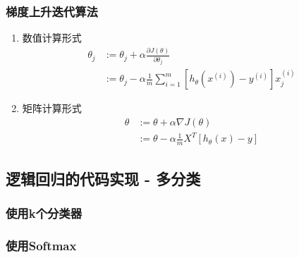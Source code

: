 \subsubsection{梯度上升迭代算法}
\begin{enumerate}
\item 数值计算形式
\begin{equation}\begin{aligned}
	\theta_j &:= \theta_j + \alpha\frac{\partial J(\theta)}{\partial \theta_j} \\
	    &:= \theta_j - \alpha \frac{1}{m} \sum_{i=1}^m \left[h_\theta(x^{(i)}) - y^{(i)}\right] x_j^{(i)}
\end{aligned}\end{equation}

\item 矩阵计算形式
\begin{equation}\begin{aligned}
	\theta &:= \theta + \alpha\nabla J(\theta) \\
		&:= \theta - \alpha \frac{1}{m} X^T \left[h_\theta(x) - y\right]
\end{aligned}\end{equation}
\end{enumerate}


\subsection{逻辑回归的代码实现 - 多分类}
\subsubsection{使用k个分类器}
\subsubsection{使用Softmax}
